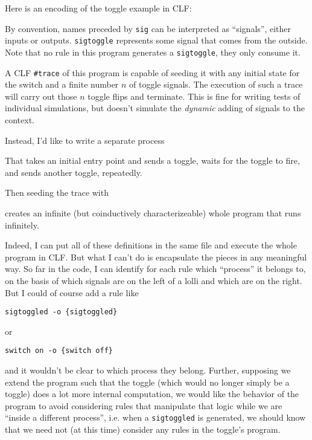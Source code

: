 \documentclass{article}
\begin{document}
Here is an encoding of the toggle example in CLF:



By convention, names preceded by \verb|sig| can be interpreted as
``signals'', either inputs or outputs. \verb|sigtoggle| represents some
signal that comes from the outside. Note that no rule in this program
generates a \verb|sigtoggle|, they only consume it.

A CLF \verb|#trace| of this program is capable of seeding it with any
initial state for the switch and a finite number $n$ of toggle signals. The
execution of such a trace will carry out those $n$ toggle flips and
terminate. This is fine for writing tests of individual simulations, but
doesn't simulate the {\em dynamic} adding of signals to the context.

Instead, I'd like to write a separate process



That takes an initial entry point and sends a toggle, waits for the toggle
to fire, and sends another toggle, repeatedly.

Then seeding the trace with



creates an infinite (but coinductively characterizeable) whole
program that runs infinitely.

Indeed, I can put all of these definitions in the same file and execute the
whole program in CLF. But what I can't do is encapsulate the pieces in any
meaningful way. So far in the code, I can identify for each rule which
``process'' it belongs to, on the basis of which signals are on the left of
a lolli and which are on the right. But I could of course add a rule like

\begin{verbatim}
sigtoggled -o {sigtoggled}
\end{verbatim}

or

\begin{verbatim}
switch on -o {switch off}
\end{verbatim}

and it wouldn't be clear to which process they belong. Further, supposing
we extend the program such that the toggle (which would no longer simply be
a toggle) does a lot more internal computation, we would like the behavior
of the program to avoid considering rules that manipulate that logic while
we are ``inside a different process'', i.e. when a \verb|sigtoggled| is
generated, we should know that we need not (at this time) consider any
rules in the toggle's program.
\end{document}
